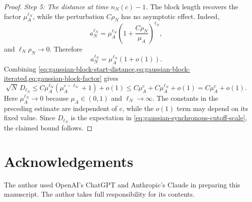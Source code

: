 \documentclass[11pt,reqno,a4paper]{article}
\begin{document}
\begin{proof}
  \emph{Step 5: The distance at time $n_N(c)-1$.}
  The block length recovers the factor $\mu_A^{\ell_N}$, while the
  perturbation $C\rho_N$ has no asymptotic effect. Indeed,
  \begin{equation*}
    a_N^{\ell_N}
    =
    \mu_A^{\ell_N}
    \left(1+\frac{C \rho_N}{\mu_A}\right)^{\ell_N},
  \end{equation*}
  and $\ell_N \rho_N\to0$. Therefore
  \begin{equation}\label{eq:gaussian-block-factor}
    a_N^{\ell_N}
    =
    \mu_A^{\ell_N}(1+o(1)).
  \end{equation}
  Combining
  \cref{eq:gaussian-block-start-distance,eq:gaussian-block-iterated,eq:gaussian-block-factor}
  gives
  \begin{equation*}
    \sqrt N\,D_{\ell_N}
    \leq
    C\mu_A^{\ell_N}
    \left(\mu_A^{c-\ell_N}+1\right)
    +
    o(1)
    \leq
    C\mu_A^c+C\mu_A^{\ell_N}+o(1)
    =
    C\mu_A^c+o(1).
  \end{equation*}
  Here $\mu_A^{\ell_N}\to0$ because $\mu_A\in(0,1)$ and
  $\ell_N\to\infty$. The constants in the preceding estimate are independent
  of $c$, while the $o(1)$ term may depend on its fixed value.
  Since $D_{\ell_N}$ is the expectation in
  \cref{eq:gaussian-synchronous-cutoff-scale}, the claimed bound follows.
\end{proof}

\section*{Acknowledgements}
The author used OpenAI's ChatGPT and Anthropic's Claude in preparing this manuscript. The author takes full responsibility for its contents.



\end{document}
